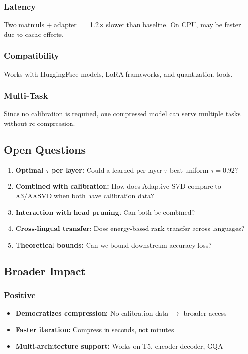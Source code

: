 \subsubsection{Latency}
Two matmuls + adapter = ~1.2$\times$ slower than baseline. On CPU, 
may be faster due to cache effects.

\subsubsection{Compatibility}
Works with HuggingFace models, LoRA frameworks, and quantization tools.

\subsubsection{Multi-Task}
Since no calibration is required, one compressed model can serve multiple 
tasks without re-compression.

\subsection{Open Questions}

\begin{enumerate}
\item \textbf{Optimal $\tau$ per layer:} Could a learned per-layer $\tau$ beat uniform
  $\tau = 0.92$?
\item \textbf{Combined with calibration:} How does Adaptive SVD compare to A3/AASVD
  when both have calibration data?
\item \textbf{Interaction with head pruning:} Can both be combined?
\item \textbf{Cross-lingual transfer:} Does energy-based rank transfer across languages?
\item \textbf{Theoretical bounds:} Can we bound downstream accuracy loss?

\end{enumerate}
\subsection{Broader Impact}

\subsubsection{Positive}
\begin{itemize}
\item \textbf{Democratizes compression:} No calibration data $\to$ broader access
\item \textbf{Faster iteration:} Compress in seconds, not minutes
\item \textbf{Multi-architecture support:} Works on T5, encoder-decoder, GQA

\end{itemize}
